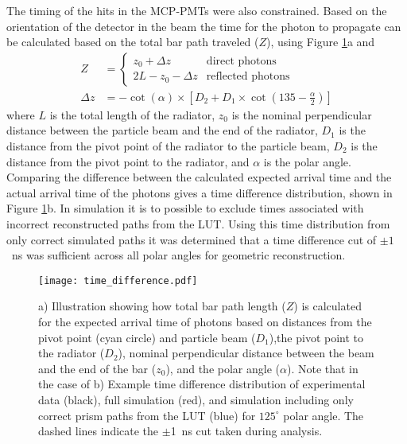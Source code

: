 The timing of the hits in the MCP-PMTs were also constrained. Based on the orientation of the detector in the beam the time for the photon to propagate can be calculated based on the total bar path traveled ($Z$), using Figure \ref{fig:time_difference}a and
\begin{equation}
\begin{split}
	Z &= 
	\begin{cases}
		z_0 + \Delta z  & \text{direct photons} \\
		2L - z_0 - \Delta z  & \text{reflected photons}
	\end{cases}
	\\
	\Delta z &= -\cot(\alpha) \times \left[ D_2 + D_1\times\cot\left( 135 - \frac{\alpha}{2} \right) \right]
\end{split}
	\label{eq:time_diff_prop}
\end{equation}
%
where $L$ is the total length of the radiator, $z_0$ is the nominal perpendicular distance between the particle beam and the end of the radiator, $D_1$ is the distance from the pivot point of the radiator to the particle beam, $D_2$ is the distance from the pivot point to the radiator, and $\alpha$ is the polar angle.
Comparing the difference between the calculated expected arrival time and the actual arrival time of the photons gives a time difference distribution, shown in Figure \ref{fig:time_difference}b. In simulation it is to possible to exclude times associated with incorrect reconstructed paths from the LUT. Using this time distribution from only correct simulated paths it was determined that a time difference cut of $\pm1$~ns was sufficient across all polar angles for geometric reconstruction.

\begin{figure}[!htb]
	\centering
	\texttt{[image: time\_difference.pdf]}
	\caption{a) Illustration showing how total bar path length ($Z$) is calculated for the expected arrival time of photons based on distances from the pivot point (cyan circle) and particle beam ($D_1$),the pivot point to the radiator ($D_2$), nominal perpendicular distance between the beam and the end of the bar ($z_0$), and the polar angle ($\alpha$). Note that in the case of b) Example time difference distribution of experimental data (black), full simulation (red), and simulation including only correct prism paths from the LUT (blue) for $125^\circ$ polar angle. The dashed lines indicate the $\pm$1~ns cut taken during analysis. }
	\label{fig:time_difference}
\end{figure}


